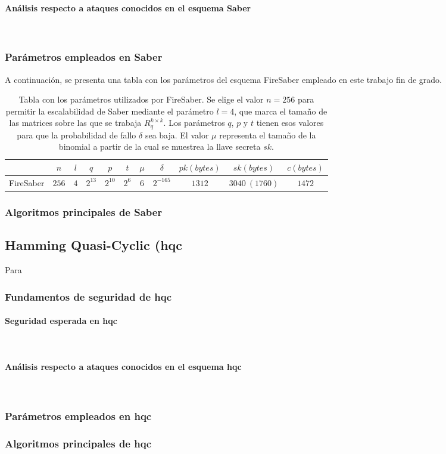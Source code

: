 \paragraph{Análisis respecto a ataques conocidos en el esquema Saber}
\mbox{}\\
\subsubsection{Parámetros empleados en Saber}
A continuación, se presenta una tabla con los parámetros del esquema FireSaber empleado en este trabajo fin de grado.
\begin{table}[H]
	\centering
	\renewcommand{\arraystretch}{1.2}
	\begin{tabular}{lcccccccccc}
		\hline
		&\(n\)&\(l\)&\(q\)&\(p\)&\(t\)&\(\mu\)&\(\delta\)&\(pk (bytes)\)&\(sk (bytes)\)&\(c (bytes)\)\\
		\hline
		FireSaber&\(256\)&\(4\)&\(2^{13}\)&\(2^{10}\)&\(2^{6}\)&\(6\)&\(2^{-165}\)&\(1312\)&\(3040 \ (1760)\)&\(1472\)\\
		\hline
	\end{tabular}
	\caption{Tabla con los parámetros utilizados por FireSaber. Se elige el valor \(n=256\) para permitir la escalabilidad de Saber mediante el parámetro \(l=4\), que marca el tamaño de las matrices sobre las que se trabaja \(R_q^{k\times k}\). Los parámetros \(q\), \(p\) y  \(t\) tienen esos valores para que la probabilidad de fallo \(\delta\) sea baja. El valor \(\mu\) representa el tamaño de la binomial a partir de la cual se muestrea la llave secreta \(sk\).}
	\label{tab:SaberParams}
\end{table}

\subsubsection{Algoritmos principales de Saber \cite{saber-spec-2020} }
\subsection{Hamming Quasi-Cyclic (\gls{hqc}}
Para  \cite{hqc-spec-2022}
\subsubsection{Fundamentos de seguridad de \gls{hqc}}
\paragraph{Seguridad esperada en \gls{hqc}}
\mbox{}\\
\paragraph{Análisis respecto a ataques conocidos en el esquema \gls{hqc}}
\mbox{}\\
\subsubsection{Parámetros empleados en \gls{hqc}}
\subsubsection{Algoritmos principales de \gls{hqc} \cite{hqc-spec-2022}}

